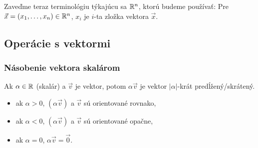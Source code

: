 Zaveďme teraz terminológiu týkajúcu sa $\mathbb{R}^n$, ktorú budeme používať:
Pre $\vec{x}=(x_1, \dots, x_n) \in \mathbb{R}^n$, $x_i$ je $i$-ta zložka vektora $\vec{x}$.



\subsection{Operácie s vektormi}

\subsubsection{Násobenie vektora skalárom}
\begin{definition}
Ak $\alpha \in \mathbb{R}$ (skalár) a $\vec{v}$ je vektor, potom $\alpha\vec{v}$ je vektor $|\alpha|$-krát predĺžený/skrátený.
\begin{itemize}
    \item ak $\alpha > 0$, $(\alpha\vec{v})$ a $\vec{v}$ sú orientované rovnako,
    \item ak $\alpha < 0$, $(\alpha\vec{v})$ a $\vec{v}$ sú orientované opačne,
    \item ak $\alpha=0$, $\alpha\vec{v} = \vec{0}$.
\end{itemize}
\end{definition}

\begin{example}
~\\
\begin{center}
\end{center}
\end{example}

